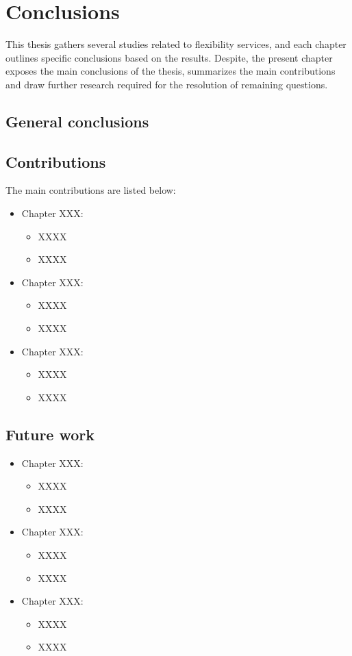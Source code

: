 
    \chapter{Conclusions}
    \label{conclus}
    This thesis gathers several studies related to flexibility services, and each chapter outlines specific conclusions based on the results. Despite, the present chapter exposes the main conclusions of the thesis, summarizes the main contributions and draw further research required for the resolution of remaining questions. 

\section{General conclusions}
	
    
     
\section{Contributions}
The main contributions are listed below: 
\begin{itemize}
\item Chapter XXX: 
	\begin{itemize}
		\item XXXX
		\item XXXX
	\end{itemize}
\item Chapter XXX: 
	\begin{itemize}
		\item XXXX
		\item XXXX
	\end{itemize}
\item Chapter XXX: 
	\begin{itemize}
		\item XXXX
		\item XXXX
	\end{itemize}
\end{itemize}
	


\section{Future work}


\begin{itemize}
\item Chapter XXX: 
	\begin{itemize}
		\item XXXX
		\item XXXX
	\end{itemize}
\item Chapter XXX: 
	\begin{itemize}
		\item XXXX
		\item XXXX
	\end{itemize}
\item Chapter XXX: 
	\begin{itemize}
		\item XXXX
		\item XXXX
	\end{itemize}
\end{itemize}
